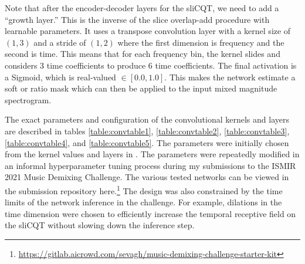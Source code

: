 \documentclass[report.tex]{subfiles}
\begin{document}
Note that after the encoder-decoder layers for the sliCQT, we need to add a ``growth layer.'' This is the inverse of the slice overlap-add procedure with learnable parameters. It uses a transpose convolution layer with a kernel size of $(1, 3)$ and a stride of $(1, 2)$ where the first dimension is frequency and the second is time. This means that for each frequency bin, the kernel slides and considers 3 time coefficients to produce 6 time coefficients. The final activation is a Sigmoid, which is real-valued $\in [0.0, 1.0]$. This makes the network estimate a soft or ratio mask which can then be applied to the input mixed magnitude spectrogram.

The exact parameters and configuration of the convolutional kernels and layers are described in tables \ref{table:convtable1}, \ref{table:convtable2}, \ref{table:convtable3}, \ref{table:convtable4}, and \ref{table:convtable5}. The parameters were initially chosen from the kernel values and layers in \textcite{plumbley1, plumbley2}. The parameters were repeatedly modified in an informal hyperparameter tuning process during my submissions to the ISMIR 2021 Music Demixing Challenge. The various tested networks can be viewed in the submission repository here.\footnote{\url{https://gitlab.aicrowd.com/sevagh/music-demixing-challenge-starter-kit}} The design was also constrained by the time limits of the network inference in the challenge. For example, dilations in the time dimension were chosen to efficiently increase the temporal receptive field on the sliCQT without slowing down the inference step.
\end{document}
